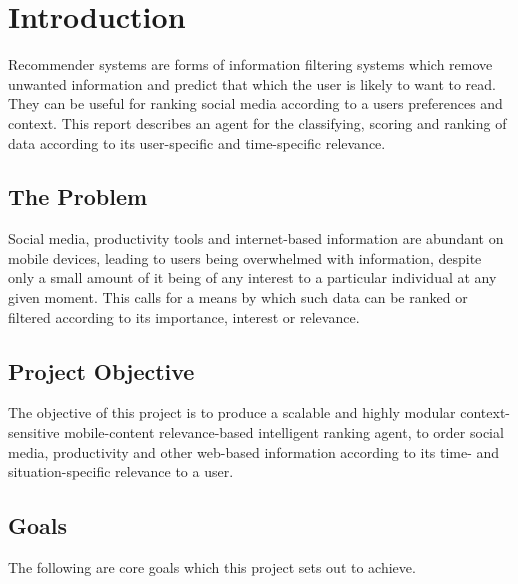 \chapter{Introduction}

Recommender systems are forms of information filtering systems which remove unwanted information and predict that which the user is likely to want to read. They can be useful for ranking social media according to a users preferences and context. This report describes an agent for the classifying, scoring and ranking of data according to its user-specific and time-specific relevance.

\section{The Problem}

Social media, productivity tools and internet-based information are abundant on mobile devices, leading to users being overwhelmed with information, despite only a small amount of it being of any interest to a particular individual at any given moment. This calls for a means by which such data can be ranked or filtered according to its importance, interest or relevance.

\section{Project Objective}

The objective of this project is to produce a scalable and highly modular context-sensitive mobile-content relevance-based intelligent ranking agent, to order social media, productivity and other web-based information according to its time- and situation-specific relevance to a user.

\section{Goals}

The following are core goals which this project sets out to achieve.

